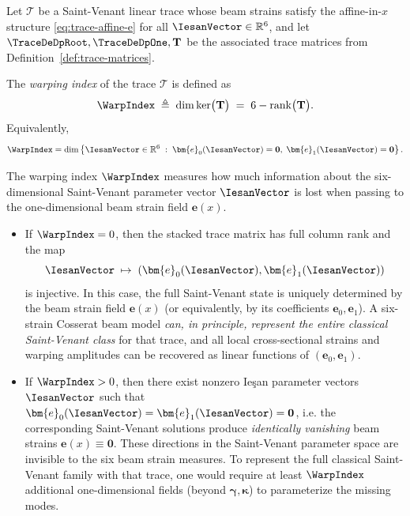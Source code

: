 \begin{definition}
\label{def:warping-index}
Let $\mathcal{T}$ be a Saint-Venant linear trace whose beam strains satisfy 
the affine-in-$x$ structure \eqref{eq:trace-affine-e} for all 
$\IesanVector \in \mathbb{R}^6$, and let 
$\TraceDeDpRoot,\TraceDeDpOne,\mathbf{T}$ be the associated 
trace matrices from Definition~\ref{def:trace-matrices}.

The \emph{warping index} of the trace $\mathcal{T}$ is defined as
\begin{equation}
\label{eq:def-warp-index}
\WarpIndex
\;\triangleq\;
\dim \ker\!\big(\mathbf{T}\big)
\;=\;
6 - \operatorname{rank}\!\big(\mathbf{T}\big).
\end{equation}
Equivalently,
\[
\WarpIndex
=
\dim\left\{
\IesanVector \in \mathbb{R}^6 \;:\;
\bm{e}_0(\IesanVector) = \mathbf{0},\;
\bm{e}_1(\IesanVector) = \mathbf{0}
\right\}.
\]
\end{definition}

The warping index $\WarpIndex$ measures how much information about the 
six-dimensional Saint-Venant parameter vector $\IesanVector$ is lost when passing to 
the one-dimensional beam strain field $\bm{e}(x)$.

\begin{itemize}
  \item If $\WarpIndex = 0$, then the stacked trace matrix has full column 
  rank and the map
  \[
  \IesanVector \;\mapsto\; (\bm{e}_0(\IesanVector),\bm{e}_1(\IesanVector))
  \]
  is injective. In this case, the full Saint-Venant state is uniquely 
  determined by the beam strain field $\bm{e}(x)$ (or equivalently, by its 
  coefficients $\bm{e}_0,\bm{e}_1$). A six-strain Cosserat beam model 
  \emph{can, in principle, represent the entire classical Saint-Venant class} 
  for that trace, and all local cross-sectional strains and warping amplitudes 
  can be recovered as linear functions of $(\bm{e}_0,\bm{e}_1)$.

  \item If $\WarpIndex > 0$, then there exist nonzero Ieşan parameter vectors 
  $\IesanVector$ such that $\bm{e}_0(\IesanVector) = \bm{e}_1(\IesanVector) = \mathbf{0}$, i.e. 
  the corresponding Saint-Venant solutions produce \emph{identically vanishing} 
  beam strains $\bm{e}(x) \equiv \mathbf{0}$. These directions in the 
  Saint-Venant parameter space are invisible to the six beam strain measures. 
  To represent the full classical Saint-Venant family with that trace, one 
  would require at least $\WarpIndex$ additional one-dimensional fields (beyond 
  $\bm{\gamma},\bm{\kappa}$) to parameterize the missing modes.
\end{itemize}

